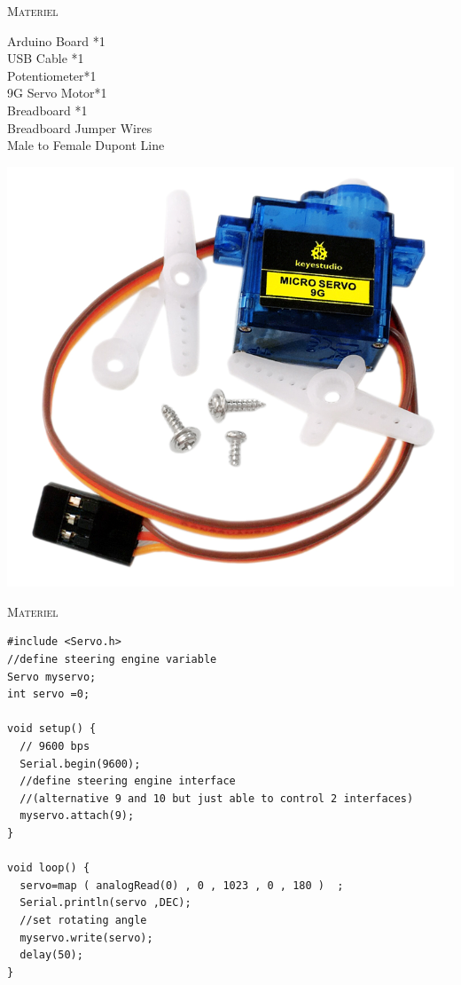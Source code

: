 \documentclass[a4paper, 11pt]{article}           %
\begin{document}
\textsc{\huge Materiel} \\                      %
\begin{minipage}{.65\textwidth} %
\begin{multicols}{2}
Arduino Board *1\\
USB Cable *1\\
Potentiometer*1 \\
9G Servo Motor*1 \\
Breadboard *1\\
Breadboard Jumper Wires \\
Male to Female Dupont Line\\
\end{multicols}
\end{minipage}
\begin{minipage}{.25\textwidth} %
\begin{center}
\includegraphics[width=\textwidth]{servo}
\end{center}
\end{minipage}

\textsc{\huge Materiel} \\                      %


\begin{lstlisting}
#include <Servo.h>
//define steering engine variable
Servo myservo;
int servo =0;

void setup() {
  // 9600 bps
  Serial.begin(9600);
  //define steering engine interface
  //(alternative 9 and 10 but just able to control 2 interfaces)
  myservo.attach(9);
}

void loop() {
  servo=map ( analogRead(0) , 0 , 1023 , 0 , 180 )  ;
  Serial.println(servo ,DEC);
  //set rotating angle
  myservo.write(servo);
  delay(50);
}
\end{lstlisting}
\end{document}
